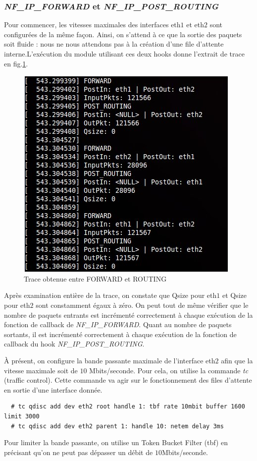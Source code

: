 \documentclass[a4paper]{article}
\begin{document}
\subsubsection{\textit{NF\_IP\_FORWARD} et \textit{NF\_IP\_POST\_ROUTING}}
Pour commencer, les vitesses maximales des interfaces eth$1$ et
eth$2$ sont configurées de la même façon. Ainsi, on s'attend à
ce que la sortie des paquets soit fluide : nous ne nous attendons
pas à la création d'une file d'attente interne.L'exécution du module
utilisant ces deux hooks donne l'extrait de trace en
fig.\ref{forwardpost}.

\begin{figure}
	\centering
	\includegraphics[scale=.5]{forward_post.jpg}
	\caption{\label{forwardpost} Trace obtenue entre FORWARD et ROUTING}
\end{figure}

Après examination entière de la trace, on constate que Qsize
pour eth$1$ et Qsize pour eth$2$ sont constamment égaux à zéro.
On peut tout de même vérifier que le nombre de paquets entrants
est incrémenté correctement à chaque exécution de la fonction
de callback de \textit{NF\_IP\_FORWARD}. Quant au nombre de paquets
sortants, il est incrémenté correctement à chaque exécution de la
fonction de callback du hook \textit{NF\_IP\_POST\_ROUTING}.

À présent, on configure la bande passante maximale de l'interface
eth$2$ afin que la vitesse maximale soit de $10$ Mbits/seconde.
Pour cela, on utilise la commande \textit{tc} (traffic control).
Cette commande va agir sur le fonctionnement des files d’attente
en sortie d’une interface donnée.
\begin{verbatim}
  # tc qdisc add dev eth2 root handle 1: tbf rate 10mbit buffer 1600 limit 3000
  # tc qdisc add dev eth2 parent 1: handle 10: netem delay 3ms
\end{verbatim}
Pour limiter la bande passante, on utilise un Token Bucket Filter
(tbf) en précisant qu’on ne peut pas dépasser un débit de
$10$Mbits/seconde.
\end{document}

